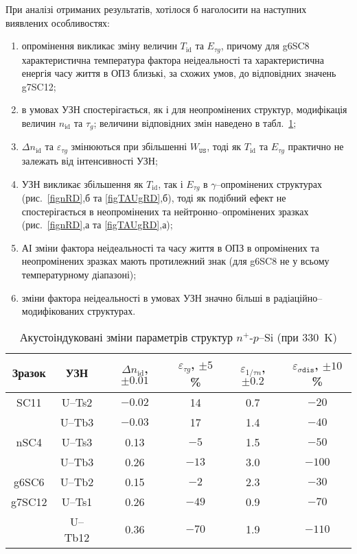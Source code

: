 При аналізі отриманих результатів, хотілося б наголосити на наступних виявлених особливостях:
\begin{enumerate}[label=\asbuk*),leftmargin=0em,itemindent=1.5em]
\item опромінення викликає зміну величин  $T_{\mathrm{id}}$ та $E_{\tau g}$, причому
 для  g6SC8 характеристична температура фактора неідеальності та характеристична енергія часу життя в ОПЗ
 близькі, за схожих умов, до відповідних значень  g7SC12;

\item в умовах УЗН спостерігається, як і для неопромінених структур, модифікація величин $n_{\mathrm{id}}$ та $\tau_g$;
  величини відповідних змін наведено в табл.~\ref{tabAIchangeRD};

\item $\Delta n_{\mathrm{id}}$ та $\varepsilon_{\tau g}$ змінюються при збільшенні $W_{\mathtt{US}}$,
 тоді як $T_{\mathrm{id}}$ та $E_{\tau g}$ практично не залежать від інтенсивності УЗН;

\item УЗН викликає збільшення як  $T_{\mathrm{id}}$, так і $E_{\tau g}$ в $\gamma$--опромінених структурах
(рис.~\ref{fignRD},б та \ref{figTAUgRD},б),
тоді як подібний ефект не спостерігається в неопромінених та нейтронно--опромінених зразках
(рис.~\ref{fignRD},а та \ref{figTAUgRD},а);

\item АІ зміни фактора неідеальності та часу життя в ОПЗ в опромінених та неопромінених зразках мають протилежний знак
 (для g6SC8 не у всьому температурному діапазоні);

\item зміни фактора неідеальності в умовах УЗН значно більші в радіаційно--модифікованих структурах.
\end{enumerate}


\begin{table}
\caption{\label{tabAIchangeRD}Акустоіндуковані зміни параметрів структур $n^+$-$p$--Si (при 330~K)
}
\center
\begin{tabular}{|c|c|c|c|c|c|} \hline
Зразок&УЗН&$\Delta n_{\mathrm{id}}$, $\pm0.01$&$\varepsilon_{\tau g}$, $\pm5$\%&$\varepsilon_{1/\tau n}$, $\pm0.2$&$\varepsilon_{\sigma\mathtt{dis}}$, $\pm10$\%\\
\hline
SC11&U--Ts2&$-0.02$&14&0.7&$-20$\\
&U--Tb3&$-0.03$&17&1.4&$-40$\\ \hline
nSC4&U--Ts3&0.13&$-5$&1.5&$-50$\\
&U--Tb3&0.26&$-13$&3.0&$-100$\\ \hline
g6SC6&U--Tb2&0.15&$-2$&2.3&$-30$\\ \hline
g7SC12&U--Ts1&0.26&$-49$&0.9&$-70$\\
&U--Tb12&0.36&$-70$&1.9&$-110$\\ \hline
\end{tabular}
\end{table}

